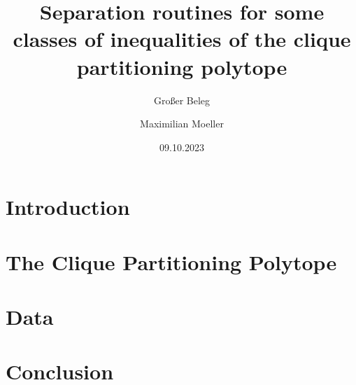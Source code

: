 \documentclass[a4paper,cdfont=true]{tudscrartcl}
\begin{document}

\date{09.10.2023}
\title{Separation routines for some classes of inequalities of the clique partitioning polytope}
\subtitle{Großer Beleg}
\author{Maximilian Moeller} 
\maketitle

\newpage
\tableofcontents
\newpage

\section{Introduction}
\section{The Clique Partitioning Polytope}
\section{Data}
\section{Conclusion}
\end{document}
